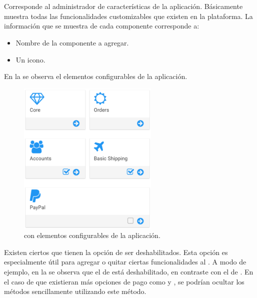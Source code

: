 \section{\dashboardEF}
	Corresponde al administrador de características de la aplicación. Básicamente muestra todas las funcionalidades customizables que existen en la plataforma.
	La información que se muestra de cada componente corresponde a:

	\begin{itemize}
		\item Nombre de la componente a agregar.
		\item Un icono.
	\end{itemize} 

	En la  se observa el  elementos configurables de la aplicación. 

	\begin{figure}[!h]
		\centering
		\includegraphics[width=0.6\textwidth]{figuras/dashboard/main_menu.png}
		\caption{\dashboardEF con elementos configurables de la aplicación.}
		\label{figure:dashboard:main_menu}
	\end{figure}

	Existen ciertos \packagesAS que tienen la opción de ser deshabilitados. Esta opción es especialmente útil para agregar o quitar ciertas funcionalidades al \websiteINT. A modo de ejemplo, en la  se observa que el \packageAS de \paypalNAME está deshabilitado, en contraste con el \packageAS de \ShippingCOM. En el caso de que existieran más opciones de pago como \googleWalletNAME y \amazonPayments, se podrían ocultar los métodos sencillamente utilizando este método.

